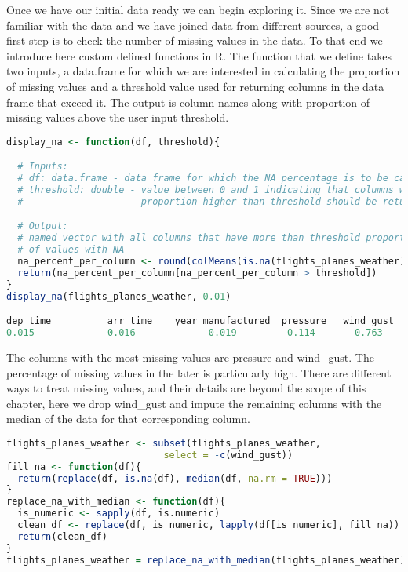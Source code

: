 Once we have our initial data ready we can begin exploring it. Since we are not familiar with the data and we have joined data from different sources, a good first step is to check the number of missing values in the data. To that end we introduce here custom defined functions in R. The function that we define takes two inputs, a data.frame for which we are interested in calculating the proportion of missing values and a threshold value used for returning columns in the data frame that exceed it. The output is column names along with proportion of missing values above the user input threshold.
\begin{lstlisting}[language=R]
display_na <- function(df, threshold){

  # Inputs:
  # df: data.frame - data frame for which the NA percentage is to be calculated
  # threshold: double - value between 0 and 1 indicating that columns with NA
  #                     proportion higher than threshold should be returned

  # Output:
  # named vector with all columns that have more than threshold proportion
  # of values with NA
  na_percent_per_column <- round(colMeans(is.na(flights_planes_weather)),3)
  return(na_percent_per_column[na_percent_per_column > threshold])
}
display_na(flights_planes_weather, 0.01)

dep_time          arr_time    year_manufactured  pressure   wind_gust
0.015             0.016             0.019         0.114       0.763
\end{lstlisting}
The columns with the most missing values are pressure and wind\_gust. The percentage of missing values in the later is particularly high. There are different ways to treat missing values, and their details are beyond the scope of this chapter, here we drop wind\_gust and impute the remaining columns with the median of the data for that corresponding column.
\begin{lstlisting}[language=R]
flights_planes_weather <- subset(flights_planes_weather,
                            select = -c(wind_gust))
fill_na <- function(df){
  return(replace(df, is.na(df), median(df, na.rm = TRUE)))
}
replace_na_with_median <- function(df){
  is_numeric <- sapply(df, is.numeric)
  clean_df <- replace(df, is_numeric, lapply(df[is_numeric], fill_na))
  return(clean_df)
}
flights_planes_weather = replace_na_with_median(flights_planes_weather)
\end{lstlisting}
